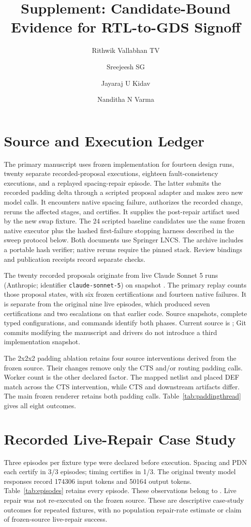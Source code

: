 \documentclass[runningheads]{llncs}
\title{Supplement: Candidate-Bound Evidence for RTL-to-GDS Signoff}
\author{Rithwik Vallabhan TV \and Sreejeesh SG \and Jayaraj U Kidav \and Nanditha N Varma}
\institute{NIELIT Calicut, India}
\newcommand{\code}[1]{\texttt{#1}}
\begin{document}
\maketitle

\section{Source and Execution Ledger}
The primary manuscript uses frozen implementation \code{\FrozenSourceShort}
for fourteen design runs, twenty separate recorded-proposal executions,
eighteen fault-consistency executions, and a replayed spacing-repair episode.
The latter submits the recorded padding delta through a scripted proposal
adapter and makes zero new model calls. It encounters native spacing failure,
authorizes the recorded change, reruns the affected stages, and certifies.
It supplies the post-repair artifact used by the new swap fixture. The
24 scripted baseline candidates use the same frozen native executor plus the
hashed first-failure stopping harness described in the sweep protocol below.
Both documents use Springer LNCS. The archive includes a portable hash verifier;
native reruns require the pinned stack. Review bindings and publication receipts
record separate checks.

The twenty recorded proposals originate from live Claude Sonnet 5 runs
(Anthropic; identifier \code{claude-sonnet-5}) on snapshot
\code{\ProposalSourceShort}. The primary
replay counts those proposal states, with six frozen certifications and
fourteen native failures. It is separate from the original nine live episodes,
which produced seven certifications and two escalations on that earlier code.
Source snapshots, complete typed configurations, and commands identify both
phases. Current source is \code{\FrozenSourceShort}; Git commits modifying the
manuscript and drivers do not introduce a third implementation snapshot.

The 2x2x2 padding ablation retains four source interventions derived from the
frozen source. Their changes remove only the CTS and/or routing padding calls.
Worker count is the other declared factor. The mapped netlist and placed DEF
match across the CTS intervention, while CTS and downstream artifacts differ.
The main frozen renderer retains both padding calls.
Table~\ref{tab:paddingthread} gives all eight outcomes.


\section{Recorded Live-Repair Case Study}
Three episodes per fixture type were declared before execution. Spacing and
PDN each certify in 3/3 episodes; timing certifies in 1/3. The original twenty
model responses record 174306 input tokens and 50164 output tokens. Table~\ref{tab:episodes}
retains every episode. These observations belong to \code{\ProposalSourceShort}.
Live repair was not re-executed on the frozen source. These are descriptive
case-study outcomes for repeated fixtures, with no population repair-rate
estimate or claim of frozen-source live-repair success.

\end{document}
